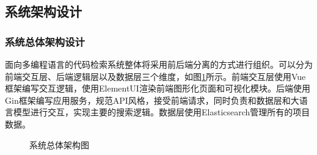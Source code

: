 \documentclass[UTF8,a4paper,12pt]{ctexart}
\numberwithin{equation}{section}
\begin{document}
\subsection{系统架构设计}
\subsubsection{系统总体架构设计}
面向多编程语言的代码检索系统整体将采用前后端分离的方式进行组织。可以分为前端交互层、后端逻辑层以及数据层三个维度，如图\ref{all_structure}所示。前端交互层使用Vue框架编写交互逻辑，使用ElementUI渲染前端图形化页面和可视化模块。后端使用Gin框架编写应用服务，规范API风格，接受前端请求，同时负责和数据层和大语言模型进行交互，实现主要的搜索逻辑。数据层使用Elasticsearch管理所有的项目数据。
\begin{figure}[H]
	\caption{系统总体架构图}
	\label{all_structure}
\end{figure}
\end{document}
